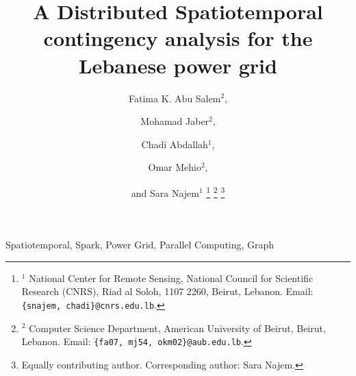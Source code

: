 \documentclass[journal]{IEEEtran}
\begin{document}
\title{A Distributed Spatiotemporal contingency analysis for the Lebanese power grid}


\author{Fatima K. Abu Salem$^{2}$, \and
Mohamad  Jaber$^{2}$, \and 
Chadi Abdallah$^{1}$, \and 
Omar Mehio$^{2}$, \and and Sara Najem$^{1}$
\thanks{$^1$ National Center for Remote Sensing, National Council for Scientific Research (CNRS), Riad al Soloh, 1107 2260, Beirut, Lebanon. Email: \texttt{\{snajem, chadi\}@cnrs.edu.lb}.}
\thanks{$^2$ Computer Science Department, American University of Beirut, Beirut, Lebanon. Email: \texttt{\{fa07, mj54, okm02\}@aub.edu.lb}.}
\thanks{Equally contributing author. Corresponding author: Sara Najem.}
}





%
{}


\maketitle


\begin{IEEEkeywords}
Spatiotemporal, Spark, Power Grid, Parallel Computing, Graph
\end{IEEEkeywords}


\IEEEpeerreviewmaketitle

\maketitle









\end{document}
